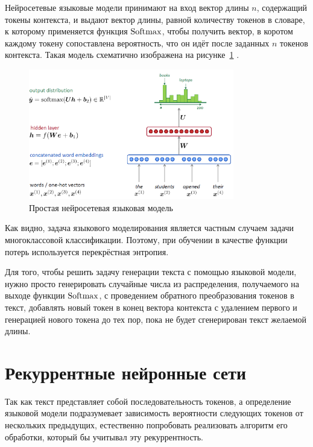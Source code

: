 Нейросетевые языковые модели принимают на вход вектор длины $n$, содержащий токены контекста, и выдают вектор длины, равной количеству токенов в словаре, к которому применяется функция $\operatorname{Softmax}$, чтобы получить вектор, в коротом каждому токену сопоставлена вероятность, что он идёт после заданных $n$ токенов контекста. Такая модель схематично изображена на рисунке \ref*{fig:lang_model} \cite{art:lang_models}.

\begin{figure}[h]
    \centering
    \includegraphics[width=0.8\textwidth]{../inc/images/language_model.png}
    \caption{Простая нейросетевая языковая модель}
    \label{fig:lang_model}
\end{figure}

Как видно, задача языкового моделирования является частным случаем задачи многоклассовой классификации. Поэтому, при обучении в качестве функции потерь используется перекрёстная энтропия.

Для того, чтобы решить задачу генерации текста с помощью языковой модели, нужно просто генерировать случайные числа из распределения, получаемого на выходе функции $\operatorname{Softmax}$, с проведением обратного преобразования токенов в текст, добавлять новый токен в конец вектора контекста с удалением первого и генерацией нового токена до тех пор, пока не будет сгенерирован текст желаемой длины.

\section{Рекуррентные нейронные сети}

Так как текст представляет собой последовательность токенов, а определение языковой модели подразумевает зависимость вероятности следующих токенов от нескольких предыдущих, естественно попробовать реализовать алгоритм его обработки, который бы учитывал эту рекуррентность.


